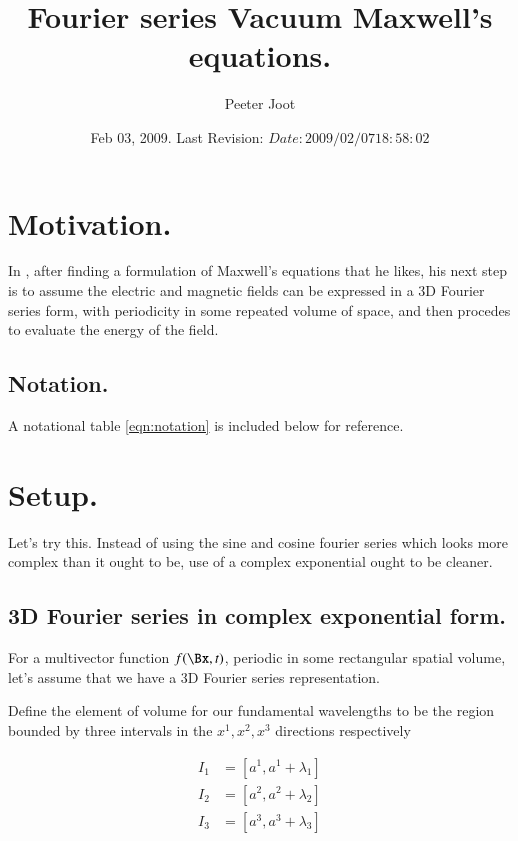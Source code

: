 \documentclass{article}
\title{ Fourier series Vacuum Maxwell's equations. }
\author{Peeter Joot}
\date{ Feb 03, 2009.  Last Revision: $Date: 2009/02/07 18:58:02 $ }
\begin{document}
\maketitle{}

\tableofcontents

\section{ Motivation. }

In \cite{bohm1989qt}, 
after finding a formulation of Maxwell's equations that he likes, his next
step is to assume the electric and magnetic fields can be expressed in 
a 3D Fourier series form, with periodicity in some repeated volume 
of space, and then procedes to evaluate the energy of the 
field.

\subsection{ Notation. }

A notational table 
\ref{eqn:notation}
is included below for reference.

\section{ Setup. }

Let's try this.  Instead of using the sine and cosine fourier series
which looks more complex than it ought to be, use of a complex exponential
ought to be cleaner.

\subsection{ 3D Fourier series in complex exponential form. }

For a multivector function $f(\Bx, t)$, periodic in some rectangular spatial volume, let's assume that we have a
3D Fourier series representation.

Define the element of volume for our fundamental wavelengths to be the region bounded by three intervals in the $x^1, x^2, x^3$ directions respectively

\begin{align*}
I_1 &= [ a^1, a^1 + \lambda_1 ] \\
I_2 &= [ a^2, a^2 + \lambda_2 ] \\
I_3 &= [ a^3, a^3 + \lambda_3 ] \\
\end{align*}
\end{document}

